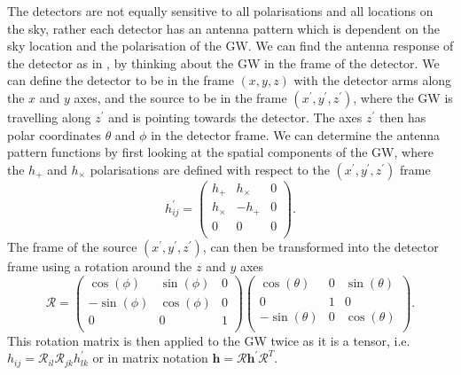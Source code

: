 The detectors are not equally sensitive to all polarisations and all locations
on the sky, rather each detector has an antenna pattern which is dependent on the sky
location and the polarisation of the \gls{GW}. We can find the antenna response of the detector as in
\citep{maggioreGravitationalWaves}, by thinking about the \gls{GW} in the frame
of the detector.  We can define the detector to be in the frame $(x,y,z)$ with
the detector arms along the $x$ and $y$ axes, and the source to be in the frame
$(x^{\prime},y^{\prime},z^{\prime})$, where the \gls{GW} is travelling along
$z^{'}$ and is pointing towards the detector.  The axes $z^{\prime}$ then has
polar coordinates $\theta$ and $\phi$ in the detector frame.  We can determine
the antenna pattern functions by first looking at the spatial components of the
\gls{GW},
where the $h_{+}$ and $h_{\times}$ polarisations are defined with respect to
the $(x^{\prime},y^{\prime},z^{\prime})$ frame
%
\begin{equation}
    \label{intro:detector:response:gwwave}
    h^{\prime}_{ij} = \left( 
    \begin{matrix} 
    h_{+} & h_{\times} & 0 \\
    h_{\times} & -h_{+} & 0 \\
    0 & 0 & 0  \\
    \end{matrix}
    \right).
\end{equation}
The frame of the source $(x^{\prime},y^{\prime},z^{\prime})$, can then be transformed into the detector frame using a rotation around the $z$ and $y$ axes 
\begin{equation}
    \label{intro:detector:response:rotation}
    \mathcal{R} = \left( 
    \begin{matrix} 
    \cos(\phi) & \sin(\phi) & 0 \\
    -\sin(\phi) & \cos(\phi) & 0 \\
    0 & 0 & 1  \\
    \end{matrix}
    \right)
    \left( 
    \begin{matrix} 
    \cos(\theta) & 0 & \sin(\theta) \\
    0 & 1 & 0 \\
    -\sin(\theta) & 0 & \cos(\theta)  \\
    \end{matrix}
    \right).
\end{equation}
This rotation matrix is then applied to the \gls{GW} twice as it is a tensor, i.e. $h_{ij} = \mathcal{R}_{il} \mathcal{R}_{jk} h^{\prime}_{lk} $ or in matrix notation $\bm{h} = \bm{\mathcal{R}} \bm{h}^{\prime} \bm{\mathcal{R}}^{T}$.

